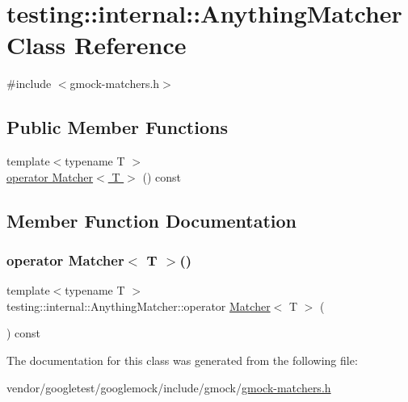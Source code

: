 \hypertarget{classtesting_1_1internal_1_1_anything_matcher}{}\section{testing\+:\+:internal\+:\+:Anything\+Matcher Class Reference}
\label{classtesting_1_1internal_1_1_anything_matcher}


{\ttfamily \#include $<$gmock-\/matchers.\+h$>$}

\subsection*{Public Member Functions}
\begin{DoxyCompactItemize}
\item 
{\footnotesize template$<$typename T $>$ }\\\hyperlink{classtesting_1_1internal_1_1_anything_matcher_ae98ebd3352f996a7fb01679917365474}{operator Matcher$<$ T $>$} () const
\end{DoxyCompactItemize}


\subsection{Member Function Documentation}
\mbox{\label{classtesting_1_1internal_1_1_anything_matcher_ae98ebd3352f996a7fb01679917365474}} 
\subsubsection{\texorpdfstring{operator Matcher$<$ T $>$()}{operator Matcher< T >()}}
{\footnotesize\ttfamily template$<$typename T $>$ \\
testing\+::internal\+::\+Anything\+Matcher\+::operator \hyperlink{classtesting_1_1_matcher}{Matcher}$<$ T $>$ (\begin{DoxyParamCaption}{ }\end{DoxyParamCaption}) const\hspace{0.3cm}{\ttfamily [inline]}}



The documentation for this class was generated from the following file\+:\begin{DoxyCompactItemize}
\item 
vendor/googletest/googlemock/include/gmock/\hyperlink{gmock-matchers_8h}{gmock-\/matchers.\+h}\end{DoxyCompactItemize}
